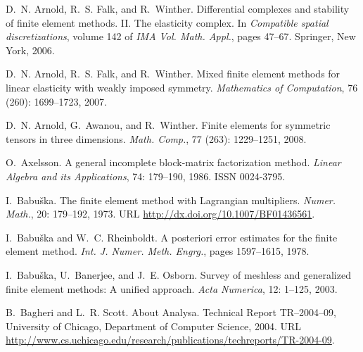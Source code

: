 \begin{thebibliography}{467}
D.~N. Arnold, R.~S. Falk, and R.~Winther.
\newblock Differential complexes and stability of finite element methods. {II}.
  {T}he elasticity complex.
\newblock In \emph{Compatible spatial discretizations}, volume 142 of \emph{IMA
  Vol. Math. Appl.}, pages 47--67. Springer, New York, 2006{}.

D.~N. Arnold, R.~S. Falk, and R.~Winther.
\newblock Mixed finite element methods for linear elasticity with weakly
  imposed symmetry.
\newblock \emph{Mathematics of Computation}, 76 (260):
  1699--1723, 2007.

D.~N. Arnold, G.~Awanou, and R.~Winther.
\newblock Finite elements for symmetric tensors in three dimensions.
\newblock \emph{Math. Comp.}, 77 (263): 1229--1251, 2008.

O.~Axelsson.
\newblock A general incomplete block-matrix factorization method.
\newblock \emph{Linear Algebra and its Applications}, 74: 179--190,
  1986.
\newblock ISSN 0024-3795.

I.~Babu{\v{s}}ka.
\newblock The finite element method with {L}agrangian multipliers.
\newblock \emph{Numer. Math.}, 20: 179--192, 1973.
\newblock URL \url{http://dx.doi.org/10.1007/BF01436561}.

I.~Babu\v{s}ka and W.~C. Rheinboldt.
\newblock A posteriori error estimates for the finite element method.
\newblock \emph{Int. J. Numer. Meth. Engrg.}, pages 1597--1615, 1978.

I.~Babu\v{s}ka, U.~Banerjee, and J.~E. Osborn.
\newblock Survey of meshless and generalized finite element methods: {A}
  unified approach.
\newblock \emph{Acta Numerica}, 12: 1--125, 2003.

B.~Bagheri and L.~R. Scott.
\newblock About {A}nalysa.
\newblock Technical Report TR--2004--09, University of Chicago, Department of
  Computer Science, 2004.
\newblock URL
  \url{http://www.cs.uchicago.edu/research/publications/techreports/TR-2004-09}.


\end{thebibliography}
